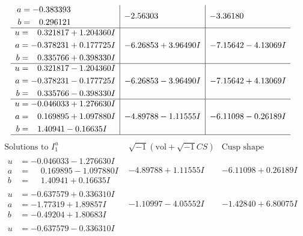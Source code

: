\documentclass[1p]{elsarticle_modified}
\theoremstyle{definition}
\newcommand{\I}{\sqrt{-1}}
\begin{document}
$$\begin{array}{c|c|c}
\begin{aligned}
a &= -0.383393\phantom{ +0.000000I} \\
b &= \phantom{-}0.296121\phantom{ +0.000000I}\end{aligned}
 & -2.56303\phantom{ +0.000000I} & -3.36180\phantom{ +0.000000I} \\ \hline\begin{aligned}
u &= \phantom{-}0.321817 + 1.204360 I \\
a &= -0.378231 + 0.177725 I \\
b &= \phantom{-}0.335766 + 0.398330 I\end{aligned}
 & -6.26853 + 3.96490 I & -7.15642 - 4.13069 I \\ \hline\begin{aligned}
u &= \phantom{-}0.321817 - 1.204360 I \\
a &= -0.378231 - 0.177725 I \\
b &= \phantom{-}0.335766 - 0.398330 I\end{aligned}
 & -6.26853 - 3.96490 I & -7.15642 + 4.13069 I \\ \hline\begin{aligned}
u &= -0.046033 + 1.276630 I \\
a &= \phantom{-}0.169895 + 1.097880 I \\
b &= \phantom{-}1.40941 - 0.16635 I\end{aligned}
 & -4.89788 - 1.11555 I & -6.11098 - 0.26189 I\\
 \hline 
 \end{array}$$\newpage$$\begin{array}{c|c|c}  
\text{Solutions to }I^u_{1}& \I (\text{vol} + \sqrt{-1}CS) & \text{Cusp shape}\\
 \hline 
\begin{aligned}
u &= -0.046033 - 1.276630 I \\
a &= \phantom{-}0.169895 - 1.097880 I \\
b &= \phantom{-}1.40941 + 0.16635 I\end{aligned}
 & -4.89788 + 1.11555 I & -6.11098 + 0.26189 I \\ \hline\begin{aligned}
u &= -0.637579 + 0.336310 I \\
a &= -1.77319 + 1.89857 I \\
b &= -0.49204 + 1.80683 I\end{aligned}
 & -1.10997 - 4.05552 I & -1.42840 + 6.80075 I \\ \hline\begin{aligned}
u &= -0.637579 - 0.336310 I \\

\end{aligned}
\end{array}$$
\end{document}
